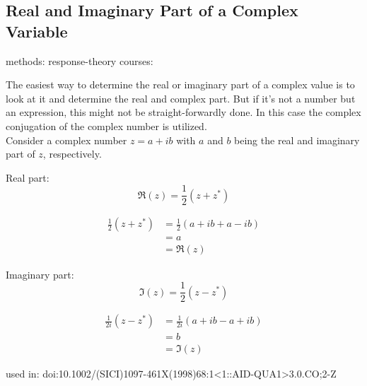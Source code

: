 \subsection{Real and Imaginary Part of a Complex Variable}

methods: {response-theory}
courses: {}

The easiest way to determine the real or imaginary part of a complex
value is to
look at it and determine the real and complex part. But if it's
not a number but an expression, this might not be straight-forwardly done.
In this case the complex conjugation of the complex number is utilized.\\

Consider a complex number $z = a +ib$ with $a$ and $b$ being the real and
imaginary part of $z$, respectively.

Real part:
\begin{equation}
 \Re(z) = \frac12 (z + z^*)
\end{equation}

\begin{align}
 \frac12 (z + z^*) &= \frac12 (a + ib + a - ib)\\
                   &= a\\
                   &= \Re(z)
\end{align}

Imaginary part:
\begin{equation}
 \Im(z) = \frac12 (z - z^*)
\end{equation}

\begin{align}
 \frac1{2i} (z - z^*) &= \frac1{2i} (a + ib - a + ib)\\
                      &= b\\
                      &= \Im(z)
\end{align}

\vspace{0.5cm}
used in: {doi:10.1002/(SICI)1097-461X(1998)68:1<1::AID-QUA1>3.0.CO;2-Z}
